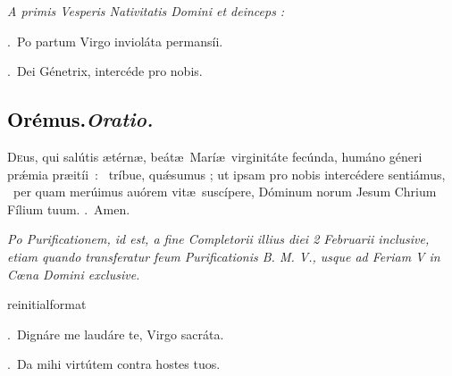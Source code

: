 \documentclass[12pt]{article} %
\newcommand{\myaboveinitial}[1]{%
    \expandafter\renewcommand\csname greinitialformat\endcsname[1]{%
        \fontsize{43}{43}\selectfont ##1
    }
    \gresetfirstlineaboveinitial{\textcolor{benred8}{\raisebox{6.0mm}{\small \textsc{\textbf{#1}}}}}{}
}
\newenvironment{rubric}{\vspace{1 mm}\color{benred8} \itshape \leftskip 0in \setlength{\parindent}{0.25in}}{\vspace{1 mm}}
\newenvironment{response}{\leftskip 0in \setlength{\parindent}{0in}}{\vspace{1 mm}}
\let\oldgresixstar\gresixstar
\renewcommand{\gresixstar}{\textcolor{benred8}{\oldgresixstar}}
\let\oldgredagger\gredagger
\renewcommand{\gredagger}{\textcolor{benred8}{\oldgredagger}}
\let\oldVbar\Vbar
\renewcommand{\Vbar}{\textcolor{benred8}{\oldVbar .}}
\let\oldRbar\Rbar
\renewcommand{\Rbar}{\textcolor{benred8}{\oldRbar .}}
\def\capitulumSpace{\hspace{20 mm}}
\begin{document}
\begin{rubric}
A primis Vesperis Nativitatis Domini et deinceps :

\end{rubric}

\begin{response}
\Vbar\ Po partum Virgo inviol\'{a}ta permans\'{i}i.

\Rbar\ Dei G\'{e}netrix, interc\'{e}de pro nobis.

\end{response}

\subsection*{\textcolor{black}{Or\'{e}mus.}\capitulumSpace \emph{Oratio.}}

\begin{response}\lettrine{D}{e}us, qui sal\'{u}tis \ae t\'{e}rn\ae , be\'{a}t\ae\ Mar\'{i}\ae\ virginit\'{a}te fec\'{u}nda, hum\'{a}no g\'{e}neri pr\'{\ae}mia \mbox{pr\ae{}it\'{i}i : \gredagger} tr\'{i}bue, qu\'{\ae}sumus ; ut ipsam pro nobis interc\'{e}dere senti\'{a}mus, \gresixstar\ per quam mer\'{u}imus au\'{o}rem vit\ae\ susc\'{i}pere, D\'{o}minum norum Jesum Chrium F\'{i}lium tuum. \Rbar\ Amen.

\end{response}


\newpage

\begin{rubric}Po Purificationem, id est, a fine Completorii illius diei 2 Februarii inclusive, etiam quando transferatur feum Purificationis B. M. V., usque ad Feriam V in C\oe na Domini exclusive.\end{rubric}


\myaboveinitial{VI}

\vspace{2mm}

\begin{response}
\Vbar\ Dign\'{a}re me laud\'{a}re te, Virgo sacr\'{a}ta.

\Rbar\ Da mihi virt\'{u}tem contra hostes tuos.

\end{response}
\end{document}
